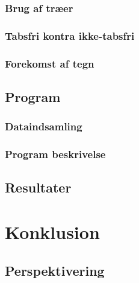 \documentclass[12pt,a4paper]{report}
\begin{document}
	\subsection{Brug af træer}
	   
   
	\subsection{Tabsfri kontra ikke-tabsfri}
    \label{tkitf}
	

	\subsection{Forekomst af tegn}
	

   \section{Program}

	\subsection{Dataindsamling}
	
   
%   	
   	
   	\subsection{Program beskrivelse}
   	
   	
   	\section{Resultater}
    \label{resultater}
   	

\chapter{Konklusion}

           

           \section{Perspektivering}
	
\end{document}
